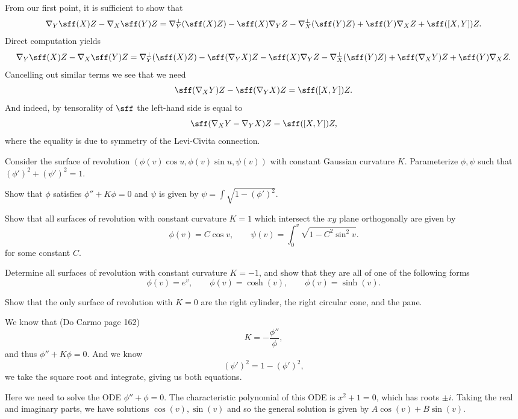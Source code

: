         \item From our first point, it is sufficient to show that
        $$ \nabla_Y\sff(X)Z - \nabla_X\sff(Y)Z = \nabla^\perp_Y(\sff(X)Z) - \sff(X)\nabla_YZ - \nabla^\perp_X(\sff(Y)Z) + \sff(Y)\nabla_XZ + \sff([X,Y])Z . $$
        Direct computation yields
        $$ \nabla_Y\sff(X)Z - \nabla_X\sff(Y)Z = \nabla^\perp_Y(\sff(X)Z) - \sff(\nabla_YX)Z - \sff(X)\nabla_YZ - \nabla^\perp_X(\sff(Y)Z) + \sff(\nabla_XY)Z + \sff(Y)\nabla_XZ . $$
        Cancelling out similar terms we see that we need
        $$ \sff(\nabla_XY)Z - \sff(\nabla_YX)Z = \sff([X,Y])Z . $$
        And indeed, by tensorality of $\sff$ the left-hand side is equal to
        $$ \sff(\nabla_XY - \nabla_YX)Z = \sff([X,Y])Z , $$
        where the equality is due to symmetry of the Levi-Civita connection.
    \eenum
\eenum

\bprob[title={Do Carmo, Differential Geometry of Curves and Surfaces, q7 p169}]

    Consider the surface of revolution $(\phi(v)\cos u,\phi(v)\sin u,\psi(v))$ with constant Gaussian curvature $K$.
    Parameterize $\phi,\psi$ such that $(\phi')^2+(\psi')^2=1$.
    \benum
        \item Show that $\phi$ satisfies $\phi''+K\phi=0$ and $\psi$ is given by $\psi=\int\sqrt{1-(\phi')^2}$.
        \item Show that all surfaces of revolution with constant curvature $K=1$ which intersect the $xy$ plane orthogonally are given by
        $$ \phi(v) = C\cos v,\qquad \psi(v) = \int_0^v\sqrt{1-C^2\sin^2v} . $$
        for some constant $C$.
        \item Determine all surfaces of revolution with constant curvature $K=-1$, and show that they are all of one of the following forms
        $$ \phi(v) = e^v,\qquad \phi(v) = \cosh(v),\qquad \phi(v) = \sinh(v) . $$
        \item Show that the only surface of revolution with $K=0$ are the right cylinder, the right circular cone, and the pane.
    \eenum

\eprop

\benum
    \item We know that (Do Carmo page 162)
    $$ K = -\frac{\phi''}\phi , $$
    and thus $\phi''+K\phi=0$.
    And we know
    $$ (\psi')^2 = 1 - (\phi')^2 , $$
    we take the square root and integrate, giving us both equations.

    \item Here we need to solve the ODE $\phi''+\phi=0$.
    The characteristic polynomial of this ODE is $x^2+1=0$, which has roots $\pm i$.
    Taking the real and imaginary parts, we have solutions $\cos(v),\sin(v)$ and so the general solution is given by $A\cos(v)+B\sin(v)$.

